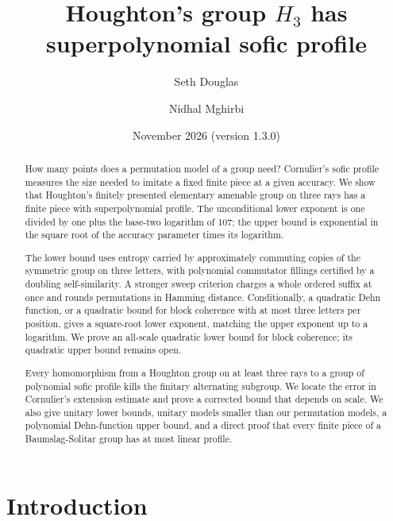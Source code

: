 \documentclass[11pt,a4paper]{article}
\title{Houghton's group $H_3$ has superpolynomial sofic profile}
\author{Seth Douglas \and Nidhal Mghirbi}
\date{November 2026 (version 1.3.0)}
\theoremstyle{plain}
\theoremstyle{definition}
\theoremstyle{remark}
\begin{document}
\maketitle

\begin{abstract}
How many points does a permutation model of a group need? Cornulier's sofic profile measures the size needed to imitate a fixed finite piece at a given accuracy. We show that Houghton's finitely presented elementary amenable group on three rays has a finite piece with superpolynomial profile. The unconditional lower exponent is one divided by one plus the base-two logarithm of 107; the upper bound is exponential in the square root of the accuracy parameter times its logarithm.

The lower bound uses entropy carried by approximately commuting copies of the symmetric group on three letters, with polynomial commutator fillings certified by a doubling self-similarity. A stronger sweep criterion charges a whole ordered suffix at once and rounds permutations in Hamming distance. Conditionally, a quadratic Dehn function, or a quadratic bound for block coherence with at most three letters per position, gives a square-root lower exponent, matching the upper exponent up to a logarithm. We prove an all-scale quadratic lower bound for block coherence; its quadratic upper bound remains open.

Every homomorphism from a Houghton group on at least three rays to a group of polynomial sofic profile kills the finitary alternating subgroup. We locate the error in Cornulier's extension estimate and prove a corrected bound that depends on scale. We also give unitary lower bounds, unitary models smaller than our permutation models, a polynomial Dehn-function upper bound, and a direct proof that every finite piece of a Baumslag-Solitar group has at most linear profile.
\end{abstract}

{\small\tableofcontents}

\section{Introduction}\label{sec:intro}
\end{document}
